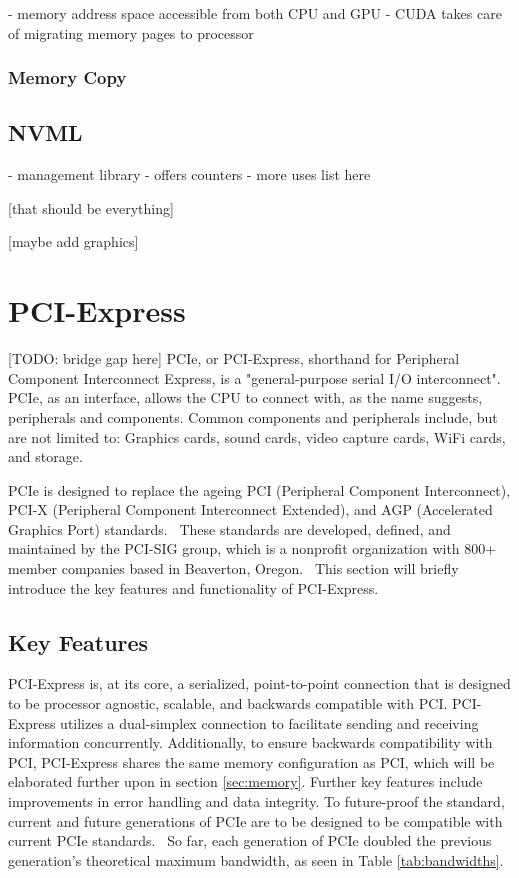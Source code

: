  - memory address space accessible from both CPU and GPU
 - CUDA takes care of migrating memory pages to processor
 
 \subsubsection{Memory Copy}
 
 \subsection{NVML}
 
 - management library 
 - offers counters
 - more uses list here
 
 [that should be everything]
 
 
 [maybe add graphics]
 
 
 
\section{PCI-Express}
[TODO: bridge gap here]
PCIe, or PCI-Express, shorthand for Peripheral Component Interconnect Express, is a "general-purpose serial I/O interconnect".~\parencite{pci-sig_pci_2011} PCIe, as an interface, allows the CPU to connect with, as the name suggests, peripherals and components. Common components and peripherals include, but are not limited to: Graphics cards, sound cards, video capture cards, WiFi cards, and storage.

PCIe is designed to replace the ageing PCI (Peripheral Component Interconnect), PCI-X (Peripheral Component Interconnect Extended), and AGP (Accelerated Graphics Port) standards.~\parencite{verma_pcie_2017} These standards are developed, defined, and maintained by the PCI-SIG group, which is a nonprofit organization with 800+ member companies based in Beaverton, Oregon.~\parencite{pci-sig_contact_nodate} This section will briefly introduce the key features and functionality of PCI-Express.

\subsection{Key Features}

PCI-Express is, at its core, a serialized, point-to-point connection that is designed to be processor agnostic, scalable, and backwards compatible with PCI.\cite{lawley_understanding_2014, pci-sig_pci_2011, pci-sig_membership_nodate} PCI-Express utilizes a dual-simplex connection to facilitate sending and receiving information concurrently. Additionally, to ensure backwards compatibility with PCI, PCI-Express shares the same memory configuration as PCI, which will be elaborated further upon in section \ref{sec:memory}. Further key features include improvements in error handling and data integrity. \parencite{verma_pcie_2017} To future-proof the standard, current and future generations of PCIe are to be designed to be compatible with current PCIe standards.~\parencite{pci-sig_membership_nodate} So far, each generation of PCIe doubled the previous generation's theoretical maximum bandwidth, as seen in Table \ref{tab:bandwidths}.

